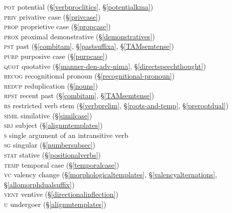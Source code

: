 \begin{tabbing}
	\textsc{pot} \> {potential (\S\ref{verbproclitics}, \S\ref{potentialkma})}\\
	\textsc{priv} \> {privative case (\S\ref{privcase})}\\
	\textsc{prop} \> {proprietive case (\S\ref{propcase})}\\
	\textsc{prox} \> {proximal demonstrative (\S\ref{demonstratives})}\\
	\textsc{pst} \> {past (\S\ref{combitam}, \S\ref{pastsuffixa}, \S\ref{TAMsemtense})}\\
	\textsc{purp} \> {purposive case (\S\ref{purpcase})}\\
	\textsc{quot} \> {quotative (\S\ref{manner-den-adv-nima}, \S\ref{directspeechthought})}\\
	\textsc{recog} \> {recognitional pronoun (\S\ref{recognitional-pronoun})}\\
	\textsc{redup} \> {reduplication (\S\ref{nouns})}\\
	\textsc{rpst} \> {recent past (\S\ref{combitam}, \S\ref{TAMsemtense})}\\
	\textsc{rs} \> {restricted verb stem (\S\ref{verbprelim}, \S\ref{roots-and-temp}, \S\ref{prerootdual})}\\
	\textsc{simil} \> {similative (\S\ref{similcase})}\\
	\textsc{sbj} \> {subject (\S\ref{alignmtemplates})}\\
	\textsc{s} \> {single argument of an intransitive verb}\\
	\textsc{sg} \> {singular (\S\ref{numbersubsec})}\\
	\textsc{stat} \> {stative (\S\ref{positionalverbs})}\\
	\textsc{temp} \> {temporal case (\S\ref{temporalcase})}\\
	\textsc{vc} \> {valency change (\S\ref{morphologicaltemplates}, \S\ref{valencyalternations}, \S\ref{allomorphdualsuffix})}\\
	\textsc{vent} \> {ventive (\S\ref{directionalinflection})}\\
	\textsc{u} \> {undergoer (\S\ref{alignmtemplates})}\\
\end{tabbing}
